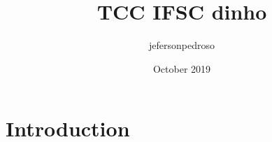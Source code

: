 \documentclass{article}
\title{TCC IFSC dinho}
\author{jefersonpedroso }
\date{October 2019}
\begin{document}
\maketitle

\section{Introduction}
\end{document}
